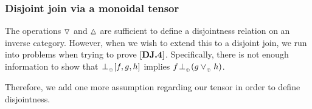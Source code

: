
\subsubsection{Disjoint join via a monoidal tensor} %
\label{ssub:disjoint_join_via_a_monoidal_tensor}

The operations $\operatorname{\triangledown}$ and $\operatorname{\vartriangle}$ are sufficient to define a disjointness relation
on an inverse category. However, when we wish to extend this to a disjoint join, we run into
problems when trying to prove $[\text{\bfseries {DJ}.{4}}]$. Specifically, there is not enough information to
show that ${}_{{}_{}}{\perp_{{}_{\oplus}}} [f,g,h]$ implies $f {}_{{}_{}}{\perp_{{}_{\oplus}}} (g \vee_{{_{\oplus}}} h)$.

Therefore, we add one more assumption regarding our tensor in order to define disjointness.

